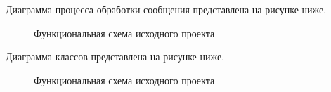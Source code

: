    Диаграмма процесса обработки сообщения представлена на рисунке ниже.
    \begin{figure}[!h]
        \centering
        \caption{Функциональная схема исходного проекта}
        \label{fig:func-schema-before}
    \end{figure}
    
    Диаграмма классов представлена на рисунке ниже.
    \begin{figure}[!h]
        \centering
        \caption{Функциональная схема исходного проекта}
        \label{fig:func-schema-before}
    \end{figure}
